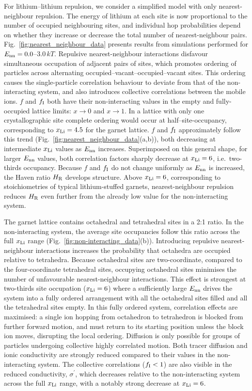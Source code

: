 \documentclass[aps,prb,twocolumn,superscriptaddress,reprint]{revtex4-1}
\newcommand{\xLi}{x_\m{Li}}
\begin{document}
For lithium--lithium repulsion, we consider a simplified model with only nearest-neighbour repulsion. 
The energy of lithium at each site is now proportional to the number of occupied neighbouring sites, and individual hop probabilities depend on whether they increase or decrease the total number of nearest-neighbour pairs. 
Fig.~\ref{fig:nearest_neighbour_data} presents results from simulations performed for $E_{\mathrm{nn}}=0.0$--$3.0\,kT$. 
Repulsive nearest-neighbour interactions disfavour simultaneous occupation of adjacent pairs of sites, which promotes ordering of particles across alternating  occupied--vacant--occupied--vacant sites.
This ordering causes the single-particle correlation behaviour to deviate from that of the non-interacting system, and also introduces collective correlations between the mobile ions.\cite{Murch_SolStatIonics1982} $f$ and $f_{\mathrm{I}}$ both have their non-interacting values in the empty and fully-occupied lattice limits: $x\to0$ and $x\to1$. In a lattice with only one crystallographic site complete ordering would occur at half--site-occupancy, corresponding to $\xLi=4.5$ for the garnet lattice. $f$ and $f_{\mathrm{I}}$ approximately follow this trend (Fig.~\ref{fig:nearest_neighbour_data}(a,b)), both decreasing at intermediate $\xLi$ values as $E_{\mathrm{nn}}$ increases. Superimposed on this general shape, for larger $E_{\mathrm{nn}}$ values, both correlation factors sharply decrease at $\xLi=6$, i.e.\ two-thirds occupancy. Because $f$ and $f_{\mathrm{I}}$ do not change uniformly as $E_{\mathrm{nn}}$ is increased, the Haven ratio $H_{\mathrm{R}}$ develops structure. Above $\xLi=6$, corresponding to stoichiometries of typical lithium-stuffed garnets, nearest-neighbour repulsion reduces $H_{\mathrm{R}}$ even further from the already low value for the non-interacting system.

The garnet lattice contains octahedral and tetrahedral sites in a 2:1 ratio. In the non-interacting system, the average site occupancies follow this ratio across the full $\xLi$ range (Fig.~\ref{fig:non-interacting_data}(b)). Introducing repulsive nearest-neighbour interactions increases the probability that octahedra are occupied relative to tetrahedra. Because octahedral sites are two-coordinate, compared to the four-coordinate tetrahedral sites,  occupying octahedral sites minimises the number of unfavourable nearest-neighbour interactions. This effect is strongest at two-thirds site occupation ($\xLi=6$) where a sufficiently large $E_{\mathrm{nn}}$ drives the system into a fully ordered arrangement with all the octahedral sites filled and all the tetrahedral sites empty. 
In this fully ordered system, correlation effects are maximised: a single ion hopping from octahedron to tetrahedron is blocked from further forward motion, and must return to its starting position unless the block ion moves, disrupting the local ordering. Diffusion is only possible for groups of particles undergoing collective highly correlated motion.\cite{BurbanoEtAl_PhysRevLett2016} Both tracer diffusion and ionic conductivity are strongly reduced compared to their values in the non-interacting system. The collective correlations ($f_{\mathrm{I}}<1$) are also visible in the reduced conductivity, $\sigma^\prime$, which decreases relative to the non-interacting system across the full $\xLi$ range, with a notably strong decrease at $\xLi=6$.
\end{document}
